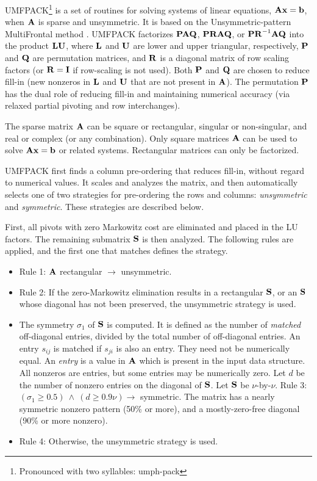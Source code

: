 \documentclass[11pt]{article}
\newcommand{\m}[1]{{\bf{#1}}}       %
\newcommand{\implies}{\rightarrow}
\begin{document}
UMFPACK\footnote{Pronounced with two syllables: umph-pack}
is a set of routines for solving systems of linear
equations, $\m{Ax}=\m{b}$, when $\m{A}$ is sparse and unsymmetric.  It is based
on the Unsymmetric-pattern MultiFrontal method \cite{DavisDuff97,DavisDuff99}.
UMFPACK factorizes
$\m{PAQ}$, $\m{PRAQ}$, or $\m{PR}^{-1}\m{AQ}$ into the product $\m{LU}$,
where $\m{L}$ and $\m{U}$
are lower and upper triangular, respectively, $\m{P}$ and $\m{Q}$ are
permutation matrices, and $\m{R}$ is a diagonal matrix of row scaling factors
(or $\m{R}=\m{I}$ if row-scaling is not used).  Both $\m{P}$ and $\m{Q}$ are
chosen to reduce fill-in (new nonzeros in $\m{L}$ and $\m{U}$ that are not
present in $\m{A}$).  The permutation $\m{P}$ has the dual role of reducing
fill-in and maintaining numerical accuracy (via relaxed partial pivoting
and row interchanges).

The sparse matrix $\m{A}$ can be square or rectangular, singular
or non-singular, and real or complex (or any combination).  Only square
matrices $\m{A}$ can be used to solve $\m{Ax}=\m{b}$ or related systems.
Rectangular matrices can only be factorized.

UMFPACK first finds a column pre-ordering that reduces fill-in, without regard
to numerical values.  It scales and analyzes the matrix, and then automatically
selects one of two strategies for pre-ordering the rows and columns:
{\em unsymmetric}
and {\em symmetric}.  These strategies are described below.

First, all pivots with zero Markowitz cost are eliminated and placed in the
LU factors.  The remaining submatrix $\m{S}$ is then analyzed.
The following rules are applied, and the first one that matches defines
the strategy.

\begin{itemize}
\item Rule 1: $\m{A}$ rectangular $\implies$ unsymmetric.
\item Rule 2:
    If the zero-Markowitz elimination results in a rectangular $\m{S}$,
    or an $\m{S}$ whose diagonal has not been preserved, the
    unsymmetric strategy is used.
\item The symmetry $\sigma_1$ of $\m{S}$ is computed.  It is defined as
    the number of {\em matched} off-diagonal entries, divided by the
    total number of off-diagonal entries.  An entry $s_{ij}$ is matched
    if $s_{ji}$ is also an entry.  They need not be numerically equal.
    An {\em entry} is a value in $\m{A}$ which is present
    in the input data structure.  All nonzeros are entries, but some entries
    may be numerically zero.
    Let $d$ be the number of nonzero entries on the diagonal of $\m{S}$.
    Let $\m{S}$ be $\nu$-by-$\nu$.
    Rule 3: $(\sigma_1 \ge 0.5) \:\wedge\: (d \ge 0.9 \nu) \implies$ symmetric.
    The matrix has a nearly symmetric nonzero pattern (50\% or more),
    and a mostly-zero-free diagonal (90\% or more nonzero).
\item Rule 4:
    Otherwise, the unsymmetric strategy is used.
\end{itemize}
\end{document}
